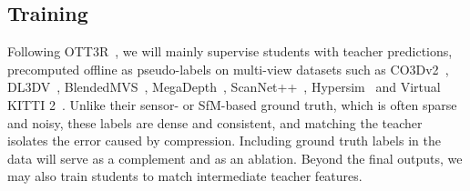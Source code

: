 \subsection{Training}

Following OTT3R~\cite{ott3r}, we will mainly supervise students with teacher predictions, precomputed offline as pseudo-labels on multi-view datasets such as CO3Dv2~\cite{co3dv2}, DL3DV~\cite{dl3dv}, BlendedMVS~\cite{blendedmvs}, MegaDepth~\cite{megadepth}, ScanNet++~\cite{scannetpp}, Hypersim~\cite{hypersim} and Virtual KITTI 2~\cite{virtualkitti2}. Unlike their sensor- or SfM-based ground truth, which is often sparse and noisy, these labels are dense and consistent, and matching the teacher isolates the error caused by compression. Including ground truth labels in the data will serve as a complement and as an ablation. Beyond the final outputs, we may also train students to match intermediate teacher features. 

